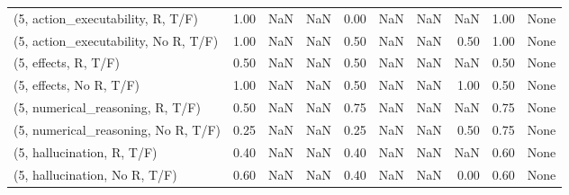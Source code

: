 \begin{table*}[h!]
\begin{adjustbox}{width=2\columnwidth,center}
\begin{tabular}{lrrr|rrr|rrr}
(5, action\_executability, R, T/F)    &                      1.00 &                   NaN &                       NaN &                          0.00 &                       NaN &                           NaN &                                    NaN &                               1.00 &                                  None \\
(5, action\_executability, No R, T/F) &                      1.00 &                   NaN &                       NaN &                          0.50 &                       NaN &                           NaN &                                   0.50 &                               1.00 &                                  None \\
(5, effects, R, T/F)                 &                      0.50 &                   NaN &                       NaN &                          0.50 &                       NaN &                           NaN &                                    NaN &                               0.50 &                                  None \\
(5, effects, No R, T/F)              &                      1.00 &                   NaN &                       NaN &                          0.50 &                       NaN &                           NaN &                                   1.00 &                               0.50 &                                  None \\
(5, numerical\_reasoning, R, T/F)     &                      0.50 &                   NaN &                       NaN &                          0.75 &                       NaN &                           NaN &                                    NaN &                               0.75 &                                  None \\
(5, numerical\_reasoning, No R, T/F)  &                      0.25 &                   NaN &                       NaN &                          0.25 &                       NaN &                           NaN &                                   0.50 &                               0.75 &                                  None \\
(5, hallucination, R, T/F)           &                      0.40 &                   NaN &                       NaN &                          0.40 &                       NaN &                           NaN &                                    NaN &                               0.60 &                                  None \\
(5, hallucination, No R, T/F)        &                      0.60 &                   NaN &                       NaN &                          0.40 &                       NaN &                           NaN &                                   0.00 &                               0.60 &                                  None \\

\end{tabular}
\end{adjustbox}
\end{table*}
